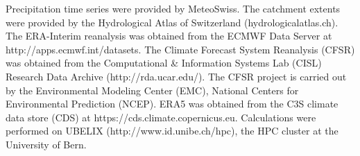 \documentclass[draft]{agujournal2019}
\begin{document}
%
%

%

%

\FloatBarrier

\acknowledgments
Precipitation time series were provided by MeteoSwiss. The catchment extents were provided by the Hydrological Atlas of Switzerland (hydrologicalatlas.ch). The ERA-Interim reanalysis was obtained from the ECMWF Data Server at http://apps.ecmwf.int/datasets. The Climate Forecast System Reanalysis (CFSR) was obtained from the Computational \& Information Systems Lab (CISL) Research Data Archive (http://rda.ucar.edu/). The CFSR project is carried out by the Environmental Modeling Center (EMC), National Centers for Environmental Prediction (NCEP). ERA5 was obtained from the C3S climate data store (CDS) at https://cds.climate.copernicus.eu. Calculations were performed on UBELIX (http://www.id.unibe.ch/hpc), the HPC cluster at the University of Bern. 






%
%
%
%
%
\end{document}

